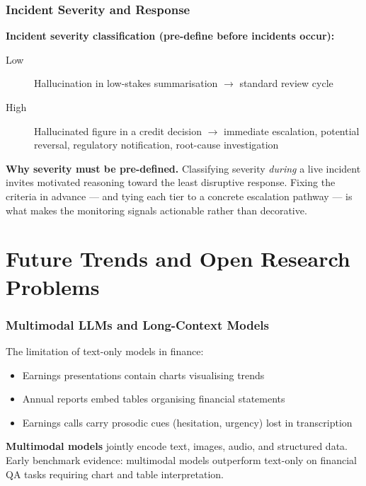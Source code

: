 \documentclass[9pt,t]{beamer}
\begin{document}
\begin{frame}
\frametitle{Incident Severity and Response}

\textbf{Incident severity classification (pre-define before incidents occur):}
\begin{description}
  \item[Low] Hallucination in low-stakes summarisation $\to$ standard review cycle
  \item[High] Hallucinated figure in a credit decision $\to$ immediate escalation, potential reversal, regulatory notification, root-cause investigation
\end{description}

\medskip
\textbf{Why severity must be pre-defined.} Classifying severity \emph{during} a
live incident invites motivated reasoning toward the least disruptive response.
Fixing the criteria in advance --- and tying each tier to a concrete escalation
pathway --- is what makes the monitoring signals actionable rather than decorative.
\end{frame}

\section{Future Trends and Open Research Problems}

\begin{frame}
\frametitle{Multimodal LLMs and Long-Context Models}

\begin{bigpicture}
The limitation of text-only models in finance:
\begin{itemize}
  \item Earnings presentations contain charts visualising trends
  \item Annual reports embed tables organising financial statements
  \item Earnings calls carry prosodic cues (hesitation, urgency) lost in transcription
\end{itemize}
\end{bigpicture}

\textbf{Multimodal models} jointly encode text, images, audio, and structured data. Early benchmark evidence: multimodal models outperform text-only on financial QA tasks requiring chart and table interpretation.
\end{frame}
\end{document}
